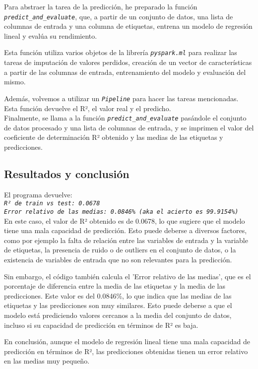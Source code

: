 \documentclass[
12pt, 
spanish, 
singlespacing,
headsepline
]{article}
\newcommand{\code}[1]{\textit{\texttt{#1}}}
\begin{document}
Para abstraer la tarea de la predicción, he preparado la función \code{predict_and_evaluate}, que, a partir de un conjunto de datos, una lista de columnas de entrada y una columna de etiquetas, entrena un modelo de regresión lineal y evalúa su rendimiento. 

Esta función utiliza varios objetos de la librería \code{pyspark.ml} para realizar las tareas de imputación de valores perdidos, creación de un vector de características a partir de las columnas de entrada, entrenamiento del modelo y evaluación del mismo.

Además, volvemos a utilizar un \code{Pipeline} para hacer las tareas mencionadas.
Esta función devuelve el R², el valor real y el predicho.
\\

Finalmente, se llama a la función \code{predict_and_evaluate} pasándole el conjunto de datos procesado y una lista de columnas de entrada, y se imprimen el valor del coeficiente de determinación R² obtenido y las medias de las etiquetas y predicciones.

\subsection{Resultados y conclusión}
El programa devuelve:
\\
\code{R² de train vs test: 0.0678\\
Error relativo de las medias: 0.0846\% (aka el acierto es 99.9154\%)} 
\\

En este caso, el valor de R² obtenido es de 0.0678, lo que sugiere que el modelo tiene una mala capacidad de predicción. Esto puede deberse a diversos factores, como por ejemplo la falta de relación entre las variables de entrada y la variable de etiquetas, la presencia de ruido o de outliers en el conjunto de datos, o la existencia de variables de entrada que no son relevantes para la predicción.

Sin embargo, el código también calcula el 'Error relativo de las medias', que es el porcentaje de diferencia entre la media de las etiquetas y la media de las predicciones. Este valor es del 0.0846\%, lo que indica que las medias de las etiquetas y las predicciones son muy similares. Esto puede deberse a que el modelo está prediciendo valores cercanos a la media del conjunto de datos, incluso si su capacidad de predicción en términos de R² es baja.

En conclusión, aunque el modelo de regresión lineal tiene una mala capacidad de predicción en términos de R², las predicciones obtenidas tienen un error relativo en las medias muy pequeño.
\end{document}

